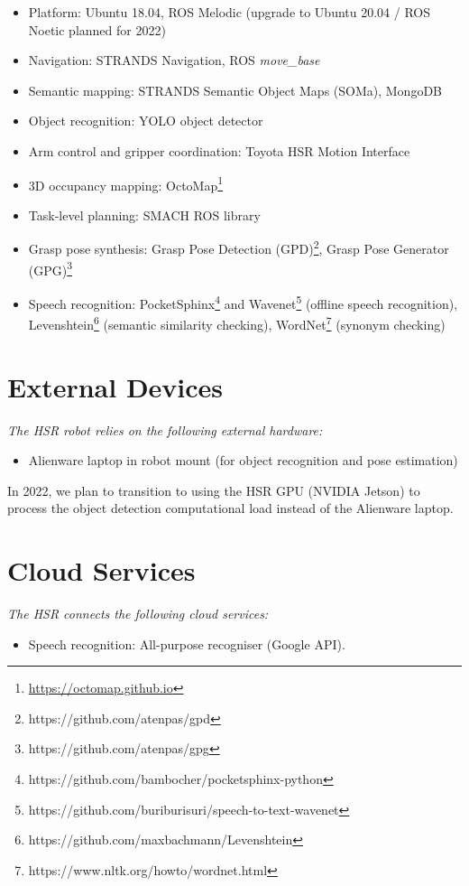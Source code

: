 \begin{itemize}
	\item Platform: Ubuntu 18.04, ROS Melodic (upgrade to Ubuntu 20.04 / ROS Noetic planned for 2022) 
	\item Navigation: STRANDS Navigation, ROS  \textit{move\_base}
	\item Semantic mapping: STRANDS Semantic Object Maps (SOMa), MongoDB
	\item Object recognition: YOLO object detector
	\item Arm control and gripper coordination: Toyota HSR Motion Interface
	\item 3D occupancy mapping: OctoMap\footnote{\url{https://octomap.github.io}}
	\item Task-level planning: SMACH ROS library
	\item Grasp pose synthesis: Grasp Pose Detection  (GPD)\footnote{https://github.com/atenpas/gpd}, Grasp Pose Generator (GPG)\footnote{https://github.com/atenpas/gpg}
	\item Speech recognition: PocketSphinx\footnote{https://github.com/bambocher/pocketsphinx-python} and Wavenet\footnote{https://github.com/buriburisuri/speech-to-text-wavenet} (offline speech recognition), Levenshtein\footnote{https://github.com/maxbachmann/Levenshtein} (semantic similarity checking), WordNet\footnote{https://www.nltk.org/howto/wordnet.html} (synonym checking) 
\end{itemize}

\section*{External Devices}

\textit{The HSR robot relies on the following external hardware:}

\begin{itemize}
	\item Alienware laptop in robot mount (for object recognition and pose estimation)
\end{itemize}

In 2022, we plan to transition to using the HSR GPU (NVIDIA Jetson) to process the object detection computational load instead of the Alienware laptop.

\section*{Cloud Services}

\textit{The HSR connects the following cloud services:}
\begin{itemize}
	\item Speech recognition: All-purpose recogniser (Google API).
\end{itemize}